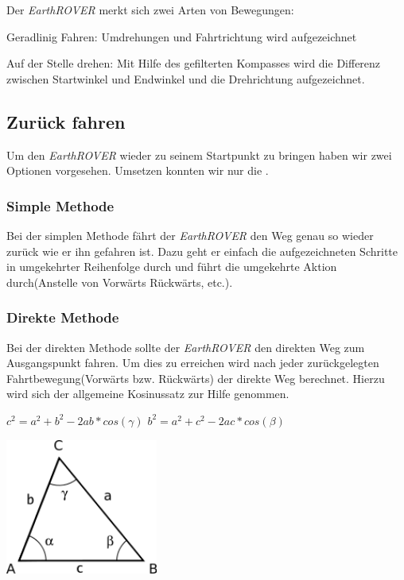 Der \textit{EarthROVER} merkt sich zwei Arten von Bewegungen:
\begin{capitemize}[Bewegungsarten]
	\item Geradlinig Fahren: Umdrehungen und Fahrtrichtung wird aufgezeichnet
	\item Auf der Stelle drehen: Mit Hilfe des gefilterten Kompasses wird die Differenz zwischen Startwinkel und Endwinkel und die Drehrichtung aufgezeichnet.
\end{capitemize}

\subsection{Zurück fahren}
Um den \textit{EarthROVER} wieder zu seinem Startpunkt zu bringen haben wir zwei Optionen vorgesehen. Umsetzen konnten wir nur die .

\subsubsection{Simple Methode}
\label{lbl:simplemethod}
Bei der simplen Methode fährt der \textit{EarthROVER} den Weg genau so wieder zurück wie er ihn gefahren ist. Dazu geht er einfach die aufgezeichneten Schritte in umgekehrter Reihenfolge durch und führt die umgekehrte Aktion durch(Anstelle von Vorwärts Rückwärts, etc.).

\subsubsection{Direkte Methode}
Bei der direkten Methode sollte der \textit{EarthROVER} den direkten Weg zum Ausgangspunkt fahren. Um dies zu erreichen wird nach jeder zurückgelegten Fahrtbewegung(Vorwärts bzw. Rückwärts) der direkte Weg berechnet. Hierzu wird sich der allgemeine Kosinussatz zur Hilfe genommen.

\begin{capdefinition}	
	$c^2 = a^2 + b^2 - 2ab*cos(\gamma)$
	$b^2 = a^2 + c^2 - 2ac*cos(\beta)$
\end{capdefinition}

\begin{capfigure}[Kosinussatz]
	\includegraphics[width=5cm]{images/implementation/cosinus}
\end{capfigure}

